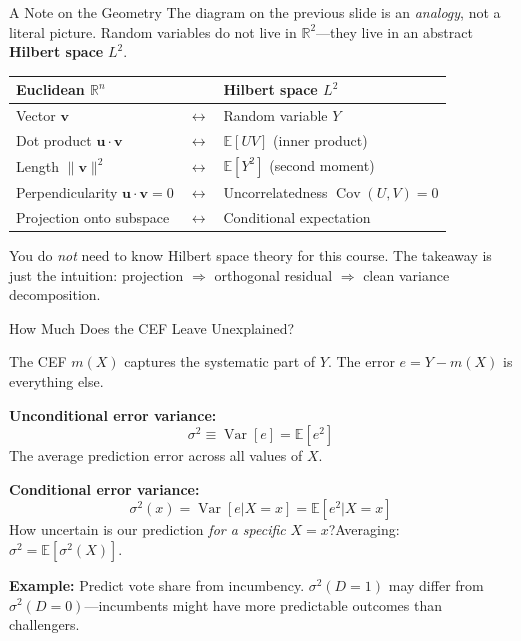 \documentclass[aspectratio=169, handout, t]{beamer}
\numberwithin{equation}{section}
\begin{document}
\begin{frame}{A Note on the Geometry}
The diagram on the previous slide is an \emph{analogy}, not a literal picture.  Random variables do not live in $\mathbb{R}^2$---they live in an abstract \textbf{Hilbert space} $L^2$.

\medskip
\begin{center}
\begin{tabular}{lll}
\toprule
\textbf{Euclidean $\mathbb{R}^n$} & & \textbf{Hilbert space $L^2$}\\
\midrule
Vector $\mathbf{v}$ & $\longleftrightarrow$ & Random variable $Y$\\
Dot product $\mathbf{u}\cdot\mathbf{v}$ & $\longleftrightarrow$ & $\mathbb{E}[UV]$ (inner product)\\
Length $\|\mathbf{v}\|^2$ & $\longleftrightarrow$ & $\mathbb{E}[Y^2]$ (second moment)\\
Perpendicularity $\mathbf{u}\cdot\mathbf{v}=0$ & $\longleftrightarrow$ & Uncorrelatedness $\operatorname{Cov}(U,V)=0$\\
Projection onto subspace & $\longleftrightarrow$ & Conditional expectation\\
\bottomrule
\end{tabular}
\end{center}

\medskip\pause
You do \emph{not} need to know Hilbert space theory for this course.  The takeaway is just the intuition: \alert{projection $\Rightarrow$ orthogonal residual $\Rightarrow$ clean variance decomposition}.
\end{frame}


\begin{frame}{How Much Does the CEF Leave Unexplained?}

The CEF $m(X)$ captures the systematic part of $Y$.  The error $e = Y - m(X)$ is everything else.

\medskip
\textbf{Unconditional error variance:}
$$\sigma^2 \equiv \operatorname{Var}[e]=\mathbb{E}[e^2]$$
The average prediction error across all values of $X$.

\medskip\pause
\textbf{Conditional error variance:}
$$\sigma^2(x)=\operatorname{Var}[e|X=x]=\mathbb{E}[e^2|X=x]$$
How uncertain is our prediction \emph{for a specific} $X=x$?\quad Averaging: $\sigma^2=\mathbb{E}[\sigma^2(X)]$.

\medskip\pause
\textbf{Example:} Predict vote share from incumbency.  $\sigma^2(D{=}1)$ may differ from $\sigma^2(D{=}0)$---incumbents might have more predictable outcomes than challengers.
\end{frame}
\end{document}
